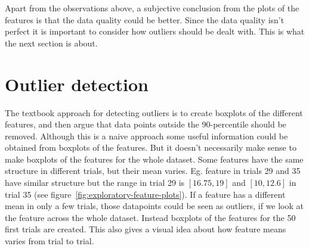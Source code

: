 Apart from the observations above, a subjective conclusion from the plots of the features is that the data quality could be better. Since the data quality isn't perfect it is important to consider how outliers should be dealt with. This is what the next section is about.


\section{Outlier detection}\label{sec:outlier-detection}
The textbook approach for detecting outliers is to create boxplots of the different features, and then argue that data points outside the 90-percentile should be removed. Although this is a naive approach some useful information could be obtained from boxplots of the features. But it doesn't necessarily make sense to make boxplots of the features for the whole dataset. Some features have the same structure in different trials, but their mean varies. Eg. feature  in trials 29 and 35 have similar structure but the range in trial 29 is $[16.75, 19]$ and $[10,12.6]$ in trial 35 (see figure~\ref{fig:exploratory-feature-plots}). If a feature has a different mean in only a few trials, those datapoints could be seen as outliers, if we look at the feature across the whole dataset. Instead boxplots of the features for the 50 first trials are created. This also gives a visual idea about how feature means varies from trial to trial. 
